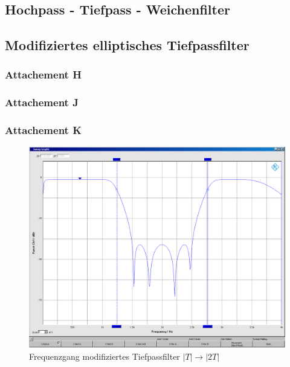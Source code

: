 \clearpage

\subsection{Hochpass - Tiefpass - Weichenfilter}



\subsection{Modifiziertes elliptisches Tiefpassfilter}
\subsubsection{Attachement H}


\subsubsection{Attachement J}


\subsubsection{Attachement K}

	\begin{figure}[h]
		\centering
		\includegraphics[width=0.7\linewidth]{Bilder/ellip2T}
		\caption{Frequenzgang modifiziertes Tiefpassfilter $|T| \rightarrow |2T|$}
		\label{fig:ellip2T}
	\end{figure}
